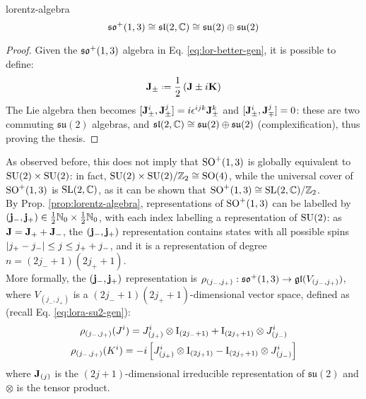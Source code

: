\begin{proposition}{}{lorentz-algebra}
  \begin{equation}
    \mathfrak{so}^+(1,3) \cong \mathfrak{sl}(2,\mathbb{C}) \cong \mathfrak{su}(2) \oplus \mathfrak{su}(2)
  \end{equation}

  \tcblower

  \begin{proof}
    Given the $ \mathfrak{so}^+(1,3) $ algebra in Eq. \ref{eq:lor-better-gen}, it is possible to define:
    \begin{equation}
      \ve{J}_{\pm} \defeq \frac{1}{2} \left( \ve{J} \pm i \ve{K} \right)
      \label{eq:lora-su2-gen}
    \end{equation}
    The Lie algebra then becomes $ [\mathbf{J}_{\pm}^i, \mathbf{J}_{\pm}^j] = i \epsilon^{ijk} \mathbf{J}_{\pm}^k $ and $ [\mathbf{J}_{\pm}^i, \mathbf{J}_{\mp}^j] = 0 $: these are two commuting $ \mathfrak{su}(2) $ algebras, and $ \mathfrak{sl}(2,\mathbb{C}) \cong \mathfrak{su}(2) \oplus \mathfrak{su}(2) $ (complexification), thus proving the thesis.
  \end{proof}
\end{proposition}

As observed before, this does not imply that $ \mathrm{SO}^+(1,3) $ is globally equivalent to $ \mathrm{SU}(2) \times \mathrm{SU}(2) $: in fact, $ \mathrm{SU}(2) \times \mathrm{SU}(2) / \mathbb{Z}_2 \cong \mathrm{SO}(4) $, while the universal cover of $ \mathrm{SO}^+(1,3) $ is $ \mathrm{SL}(2,\mathbb{C}) $, as it can be shown that $ \mathrm{SO}^+(1,3) \cong \mathrm{SL}(2,\mathbb{C}) / \mathbb{Z}_2 $.\\
By Prop. \ref{prop:lorentz-algebra}, representations of $ \mathrm{SO}^+(1,3) $ can be labelled by $ (\mathbf{j}_-,\mathbf{j}_+) \in \frac{1}{2} \mathbb{N}_0 \times \frac{1}{2} \mathbb{N}_0 $, with each index labelling a representation of $ \mathrm{SU}(2) $: as $ \mathbf{J} = \mathbf{J}_+ + \mathbf{J}_- $, the $ (\mathbf{j}_-,\mathbf{j}_+) $ representation contains states with all possible spins $ \left\lvert j_+ - j_-\right\rvert \le j \le j_+ + j_- $, and it is a representation of degree $ n = \left( 2j_- + 1 \right) \left( 2j_+ + 1 \right) $.\\
More formally, the $ (\mathbf{j}_-,\mathbf{j}_+) $ representation is $ \rho_{(j_-,j_+)} : \mathfrak{so}^+(1,3) \rightarrow \mathfrak{gl}(V_{(j_-,j_+)}) $, where $ V_{(j_-,j_+)} $ is a $ (2j_- + 1)(2j_+ + 1) $-dimensional vector space, defined as (recall Eq. \ref{eq:lora-su2-gen}):
\begin{equation}
  \begin{gathered}
    \rho_{(j_-,j_+)}(J^i) = J^i_{(j_+)} \otimes \mathrm{I}_{(2j_- + 1)} + \mathrm{I}_{(2j_+ + 1)} \otimes J^i_{(j_-)} \\
    \rho_{(j_-,j_+)}(K^i) = -i \left[ J^i_{(j_+)} \otimes \mathrm{I}_{(2j_ + 1)} - \mathrm{I}_{(2j_+ + 1)} \otimes J^i_{(j_-)} \right]
  \end{gathered}
  \label{eq:lorentz-su2-repr}
\end{equation}
where $ \mathbf{J}_{(j)} $ is the $ (2j + 1) $-dimensional irreducible representation of $ \mathfrak{su}(2) $ and $ \otimes $ is the tensor product\footnotemark.

